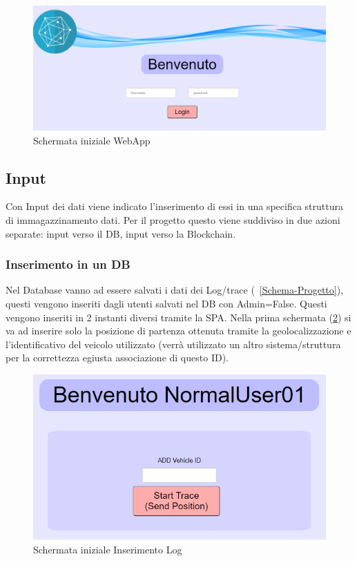 \documentclass[11pt,a4paper,titlepage]{report}
\begin{document}
\begin{figure}[h]
	\includegraphics[width=\textwidth]{HomePage}
	\centering
	\caption{Schermata iniziale WebApp}
	\label{fig:HomePage}
\end{figure}

\subsection{Input}
Con Input dei dati viene indicato l'inserimento di essi in una specifica struttura di immagazzinamento dati. Per il progetto questo viene suddiviso in due azioni separate: input verso il DB, input verso la Blockchain.
\subsubsection{Inserimento in un DB}
Nel Database vanno ad essere salvati i dati dei Log/trace (~\ref{Schema-Progetto}), questi vengono inseriti dagli utenti salvati nel DB con Admin=False. Questi vengono inseriti in 2 instanti diversi tramite la SPA.
Nella prima schermata (\ref{fig:Init_Log}) si va ad inserire solo la posizione di partenza ottenuta tramite la geolocalizzazione e l'identificativo del veicolo utilizzato (verrà utilizzato un altro sistema/struttura per la correttezza egiusta associazione di questo ID).

\begin{figure}[h]
	\includegraphics[width=\textwidth]{Init_Log}
	\centering
	\caption{Schermata iniziale Inserimento Log}
	\label{fig:Init_Log}
\end{figure}
\end{document}
